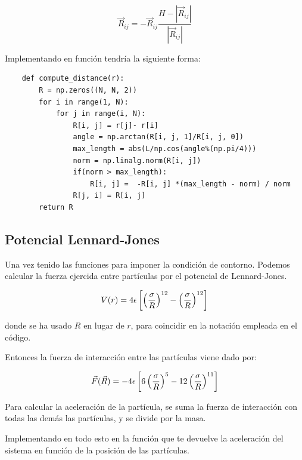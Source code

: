 \documentclass[11pt, twoside]{article} %
\begin{document}
\begin{equation}
    \vec{R}_{ij} = - \vec{R}_{ij} \frac{H-|\vec{R}_{ij}|}{|\vec{R}_{ij}|}
    \label{eq:redef_Rij}
\end{equation}

Implementando en función tendría la siguiente forma:

\begin{verbatim}
    def compute_distance(r):
        R = np.zeros((N, N, 2))
        for i in range(1, N):
            for j in range(i, N):
                R[i, j] = r[j]- r[i]
                angle = np.arctan(R[i, j, 1]/R[i, j, 0])
                max_length = abs(L/np.cos(angle%(np.pi/4)))
                norm = np.linalg.norm(R[i, j])
                if(norm > max_length):
                    R[i, j] =  -R[i, j] *(max_length - norm) / norm
                R[j, i] = R[i, j]
        return R
\end{verbatim}

\subsection{Potencial Lennard-Jones}

Una vez tenido las funciones para imponer la condición de contorno. Podemos
calcular la fuerza ejercida entre partículas por el potencial de Lennard-Jones.

\begin{equation}
    V(r) = 4\epsilon\left[\left(\frac{\sigma}{R}\right)^{12}-
        \left(\frac{\sigma}{R}\right)^{12}\right]
    \label{eq:Lennard_Jones_potential}
\end{equation}

donde se ha usado $R$ en lugar de $r$, para coincidir en la notación empleada en 
el código.

\vspace{3mm}

Entonces la fuerza de interacción entre las partículas viene dado por:

\begin{equation}
    \vec{F}(\vec{R}) =  - 4\epsilon\left[6\left(\frac{\sigma}{R}\right)^{5}-
    12\left(\frac{\sigma}{R}\right)^{11}\right]
\end{equation}

Para calcular la aceleración de la partícula, se suma la fuerza de interacción con
todas las demás las partículas, y se divide por la masa.

Implementando en todo esto en la función que te devuelve la aceleración del sistema
en función de la posición de las partículas.
\end{document}
